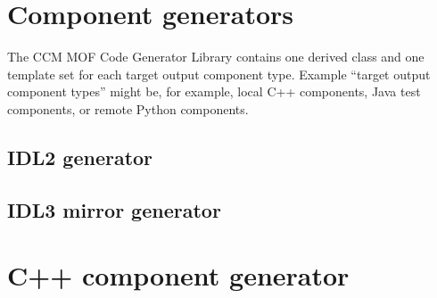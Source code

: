 \section{Component generators}

The CCM MOF Code Generator Library contains one derived class and one template
set for each target output component type. Example ``target output component
types'' might be, for example, local C++ components, Java test components, or
remote Python components.

\subsection{IDL2 generator}



\subsection{IDL3 mirror generator}



\section{C++ component generator}










